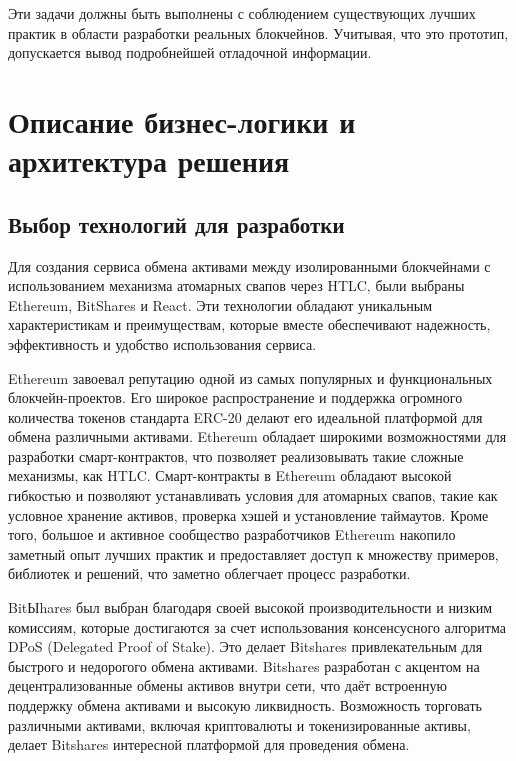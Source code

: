 Эти задачи должны быть выполнены с соблюдением существующих лучших практик в области разработки реальных блокчейнов. Учитывая, что это прототип, допускается вывод подробнейшей отладочной информации.


\section{Описание бизнес-логики и архитектура решения}

\subsection{Выбор технологий для разработки}

Для создания сервиса обмена активами между изолированными блокчейнами с использованием механизма атомарных свапов через HTLC, были выбраны Ethereum, BitShares и React. Эти технологии обладают уникальным характеристикам и преимуществам, которые вместе обеспечивают надежность, эффективность и удобство использования сервиса.

Ethereum завоевал репутацию одной из самых популярных и функциональных блокчейн-проектов. Его широкое распространение и поддержка огромного количества токенов стандарта ERC-20 делают его идеальной платформой для обмена различными активами. Ethereum обладает широкими возможностями для разработки смарт-контрактов, что позволяет реализовывать такие сложные механизмы, как HTLC. Смарт-контракты в Ethereum обладают высокой гибкостью и позволяют устанавливать условия для атомарных свапов, такие как условное хранение активов, проверка хэшей и установление таймаутов. Кроме того, большое и активное сообщество разработчиков Ethereum накопило заметный опыт лучших практик и предоставляет доступ к множеству примеров, библиотек и решений, что заметно облегчает процесс разработки.

BitЫhares был выбран благодаря своей высокой производительности и низким комиссиям, которые достигаются за счет использования консенсусного алгоритма DPoS (Delegated Proof of Stake). Это делает Bitshares привлекательным для быстрого и недорогого обмена активами. Bitshares разработан с акцентом на децентрализованные обмены активов внутри сети, что даёт встроенную поддержку обмена активами и высокую ликвидность. Возможность торговать различными активами, включая криптовалюты и токенизированные активы, делает Bitshares интересной платформой для проведения обмена.


